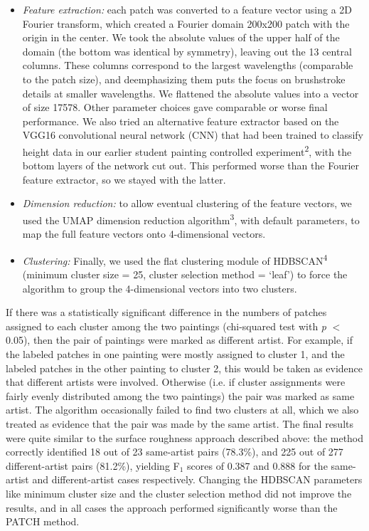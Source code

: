 \documentclass[11pt]{article}
\begin{document}
\begin{itemize}

\item {\em Feature extraction:} each patch was converted to a feature vector using a 2D Fourier transform, which created a Fourier domain 200x200 patch with the origin in the center. We took the absolute values of the upper half of the domain (the bottom was identical by symmetry), leaving out the 13 central columns. These columns correspond to the largest wavelengths (comparable to the patch size), and deemphasizing them puts the focus on brushstroke details at smaller wavelengths. We flattened the absolute values into a vector of size 17578. Other parameter choices gave comparable or worse final performance. We also tried an alternative feature extractor based on the VGG16 convolutional neural network (CNN) that had been trained to classify height data in our earlier student painting controlled experiment\textsuperscript{2}, with the bottom layers of the network cut out. This performed worse than the Fourier feature extractor, so we stayed with the latter.

\item {\em Dimension reduction:} to allow eventual clustering of the feature vectors, we used the UMAP dimension reduction algorithm\textsuperscript{3}, with default parameters, to map the full feature vectors onto 4-dimensional vectors.

\item {\em Clustering:} Finally, we used the flat clustering module of HDBSCAN\textsuperscript{4} (minimum cluster size = 25, cluster selection method = ‘leaf’) to force the algorithm to group the 4-dimensional vectors into two clusters. 

\end{itemize}

If there was a statistically significant difference in the numbers of patches assigned to each cluster among the two paintings (chi-squared test with \textit{p} $<$ 0.05), then the pair of paintings were marked as different artist. For example, if the labeled patches in one painting were mostly assigned to cluster 1, and the labeled patches in the other painting to cluster 2, this would be taken as evidence that different artists were involved. Otherwise (i.e. if cluster assignments were fairly evenly distributed among the two paintings) the pair was marked as same artist. The algorithm occasionally failed to find two clusters at all, which we also treated as evidence that the pair was made by the same artist. The final results were quite similar to the surface roughness approach described above: the method correctly identified 18 out of 23 same-artist pairs (78.3\%), and 225 out of 277 different-artist pairs (81.2\%), yielding F$_1$ scores of 0.387 and 0.888 for the same-artist and different-artist cases respectively. Changing the HDBSCAN parameters like minimum cluster size and the cluster selection method did not improve the results, and in all cases the approach performed significantly worse than the PATCH method.
\end{document}
